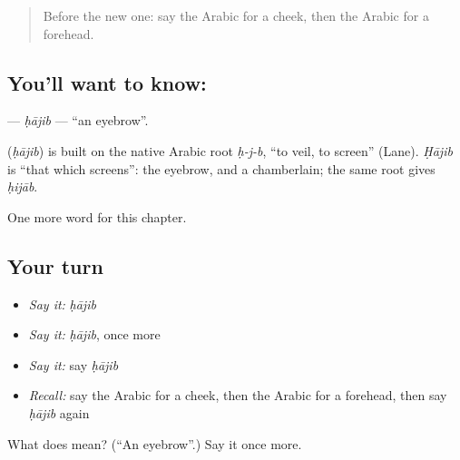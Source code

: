 \label{lesson:AR-C138-hajib}



\begin{quote}
Before the new one: say the Arabic for a cheek, then the Arabic for a forehead.
\end{quote}

\subsection*{You'll want to know: }
\textbf{} — \emph{ḥājib} — \textquotedblleft{}an eyebrow\textquotedblright{}.

\begin{cousinweb}
\textbf{} (\emph{ḥājib}) is built on the native Arabic root \emph{ḥ-j-b}, \textquotedblleft{}to veil, to screen\textquotedblright{} (Lane). \emph{Ḥājib} is \textquotedblleft{}that which screens\textquotedblright{}: the eyebrow, and a chamberlain; the same root gives \emph{ḥijāb}.
\end{cousinweb}

\begin{grammarlens}[title={What you've built}]
One more word for this chapter.
\end{grammarlens}

\subsection*{Your turn}
\begin{itemize}
\raggedright
  \item \emph{Say it:} \emph{ḥājib}
  \item \emph{Say it:} \emph{ḥājib}, once more
  \item \emph{Say it:} say \emph{ḥājib}
  \item \emph{Recall:} say the Arabic for a cheek, then the Arabic for a forehead, then say \emph{ḥājib} again
\end{itemize}

\begin{tcolorbox}[breakable,colback=teal!4,colframe=teal!35!black,title={Before you move on}]
What does  mean? (\textquotedblleft{}An eyebrow\textquotedblright{}.) Say it once more.
\end{tcolorbox}

